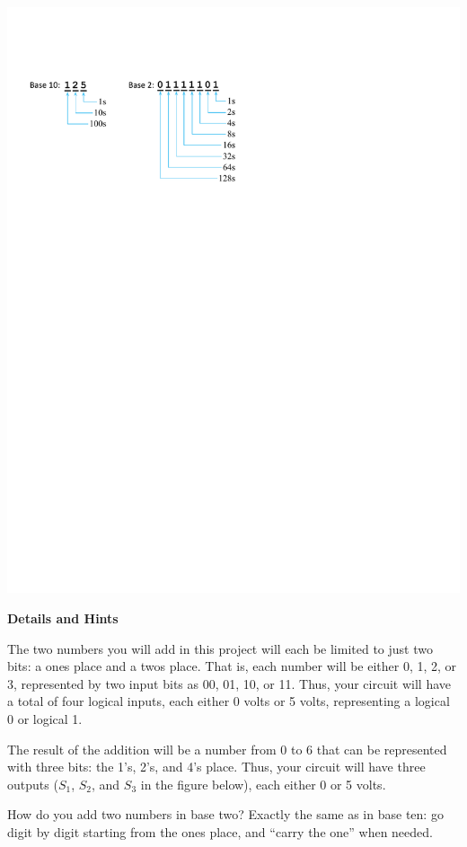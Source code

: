 \begin{center}
\includegraphics{digital_electronics/base_two.pdf}
\end{center}

\textbf{Details and Hints}

The two numbers you will add in this project will each be limited to just two bits: a ones place and a twos place.  That is, each number will be either 0, 1, 2, or 3, represented by two input bits as 00, 01, 10, or 11.  Thus, your circuit will have a total of four logical inputs, each either 0 volts or 5 volts, representing a logical 0 or logical 1.  

The result of the addition will be a number from 0 to 6 that can be represented with three bits: the 1's, 2's, and 4's place.  Thus, your circuit will have three outputs ($S_1$, $S_2$, and $S_3$ in the figure below), each either 0 or 5 volts.  

How do you add two numbers in base two?  Exactly the same as in base ten: go digit by digit starting from the ones place, and ``carry the one'' when needed.

